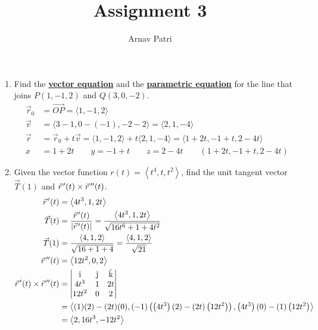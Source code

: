 \documentclass[12pt, A4]{article}
\title{Assignment 3}
\author{Arnav Patri}
\renewcommand{\Vec}[1]{\overrightarrow{#1}}
\newcommand{\vi}{\text{\^\i}}
\newcommand{\vj}{\text{\^\j}}
\newcommand{\vk}{\text{\^k}}
\newcommand{\vps}{\hspace{0.5mm}}
\begin{document}
	\maketitle
	\begin{enumerate}
		\item	
			Find the \textbf{\underline{vector equation}} and the \textbf{\underline{parametric equation}} for the line that joins $P(1, -1, 2)$ and $Q(3, 0, -2)$. \\
			\begin{align*}
				\vec{r}_0 &= \Vec{OP} 
						= \langle 1, -1, 2 \rangle \\
				\vec{v} &= \langle 3 - 1, 0 - (-1), -2 - 2 \rangle
						= \langle 2, 1, -4 \rangle \\
				\vec{r} &= \vec{r}_0 + t\vec{v}
						= \langle 1, -1, 2 \rangle + t\langle 2, 1, -4 \rangle
						= \langle 1 + 2t, -1 + t, 2 - 4t \rangle \\
				x &= 1 + 2t \qquad 
						y = -1 + t \qquad 
						z = 2-4t \qquad
						(1 + 2t, -1 + t, 2 - 4t)
			\end{align*}
		\item
			Given the vector function $r(t) = \left\langle t^4, t, t^2 \right\rangle$, find the unit tangent vector $\vec{T}(1)$ and $\vec{r}\vps'(t) \times \vec{r}\vps''(t)$.
			\begin{align*}
				\vec{r}\vps'(t) &= \left\langle 4t^3, 1, 2t \right\rangle \\
				\vec{T}(t) &= \frac{\vec{r}\vps'(t)}{|\vec{r}\vps'(t)|} 
						= \frac{\left\langle 4t^3, 1, 2t \right\rangle}{\sqrt{16t^6 + 1 + 4t^2}}\\
				\vec{T}(1) &= \frac{\langle 4, 1, 2 \rangle}{\sqrt{16 + 1 + 4}}
						= \frac{\langle 4, 1, 2 \rangle}{\sqrt{21}} \\
				\vec{r}\vps''(t) &= \left\langle 12t^2, 0, 2 \right\rangle \\
				\vec{r}\vps'(t) \times \vec{r}\vps''(t) &=
						\begin{vmatrix}
							\vi & \vj & \vk \\
							4t^3 & 1 & 2t \\
							12t^2 & 0 & 2
						\end{vmatrix} \\
					&= \left\langle (1)(2) - (2t)(0), (-1)\left(\left(4t^3\right)(2) - (2t)\left(12t^2\right)\right), \left(4t^3\right)(0) - (1)\left(12t^2\right) \right\rangle \\
					&= \left\langle 2, 16t^3, -12t^2 \right\rangle
			\end{align*}
	\end{enumerate}
\end{document}
